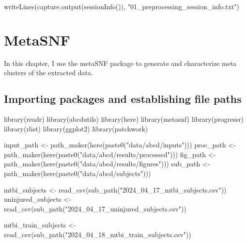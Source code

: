 \documentclass[
  letterpaper,
  DIV=11,
  numbers=noendperiod]{scrreprt}
\newenvironment{Shaded}{\begin{snugshade}}{\end{snugshade}}
\newcommand{\FunctionTok}[1]{\textcolor[rgb]{0.28,0.35,0.67}{#1}}
\newcommand{\NormalTok}[1]{\textcolor[rgb]{0.00,0.23,0.31}{#1}}
\newcommand{\OtherTok}[1]{\textcolor[rgb]{0.00,0.23,0.31}{#1}}
\newcommand{\StringTok}[1]{\textcolor[rgb]{0.13,0.47,0.30}{#1}}
\begin{document}
\begin{Shaded}
\begin{Highlighting}[]
\FunctionTok{writeLines}\NormalTok{(}\FunctionTok{capture.output}\NormalTok{(}\FunctionTok{sessionInfo}\NormalTok{()), }\StringTok{"01\_preprocessing\_session\_info.txt"}\NormalTok{)}
\end{Highlighting}
\end{Shaded}

\chapter{MetaSNF}\label{metasnf}

In this chapter, I use the metaSNF package to generate and characterize
meta clusters of the extracted data.

\section{Importing packages and establishing file
paths}\label{importing-packages-and-establishing-file-paths}

\begin{Shaded}
\begin{Highlighting}[]
\FunctionTok{library}\NormalTok{(readr)}
\FunctionTok{library}\NormalTok{(abcdutils)}
\FunctionTok{library}\NormalTok{(here)}
\FunctionTok{library}\NormalTok{(metasnf)}
\FunctionTok{library}\NormalTok{(progressr)}
\FunctionTok{library}\NormalTok{(rlist)}
\FunctionTok{library}\NormalTok{(ggplot2)}
\FunctionTok{library}\NormalTok{(patchwork)}

\NormalTok{input\_path }\OtherTok{\textless{}{-}} \FunctionTok{path\_maker}\NormalTok{(}\FunctionTok{here}\NormalTok{(}\FunctionTok{paste0}\NormalTok{(}\StringTok{"data/abcd/inputs"}\NormalTok{)))}
\NormalTok{proc\_path }\OtherTok{\textless{}{-}} \FunctionTok{path\_maker}\NormalTok{(}\FunctionTok{here}\NormalTok{(}\FunctionTok{paste0}\NormalTok{(}\StringTok{"data/abcd/results/processed"}\NormalTok{)))}
\NormalTok{fig\_path }\OtherTok{\textless{}{-}} \FunctionTok{path\_maker}\NormalTok{(}\FunctionTok{here}\NormalTok{(}\FunctionTok{paste0}\NormalTok{(}\StringTok{"data/abcd/results/figures"}\NormalTok{)))}
\NormalTok{sub\_path }\OtherTok{\textless{}{-}} \FunctionTok{path\_maker}\NormalTok{(}\FunctionTok{here}\NormalTok{(}\FunctionTok{paste0}\NormalTok{(}\StringTok{"data/abcd/subjects"}\NormalTok{)))}

\NormalTok{mtbi\_subjects }\OtherTok{\textless{}{-}} \FunctionTok{read\_csv}\NormalTok{(}\FunctionTok{sub\_path}\NormalTok{(}\StringTok{"2024\_04\_17\_mtbi\_subjects.csv"}\NormalTok{))}
\NormalTok{uninjured\_subjects }\OtherTok{\textless{}{-}} \FunctionTok{read\_csv}\NormalTok{(}\FunctionTok{sub\_path}\NormalTok{(}\StringTok{"2024\_04\_17\_uninjured\_subjects.csv"}\NormalTok{))}

\NormalTok{mtbi\_train\_subjects }\OtherTok{\textless{}{-}} \FunctionTok{read\_csv}\NormalTok{(}\FunctionTok{sub\_path}\NormalTok{(}\StringTok{"2024\_04\_18\_mtbi\_train\_subjects.csv"}\NormalTok{))}
\end{Highlighting}
\end{Shaded}
\end{document}
